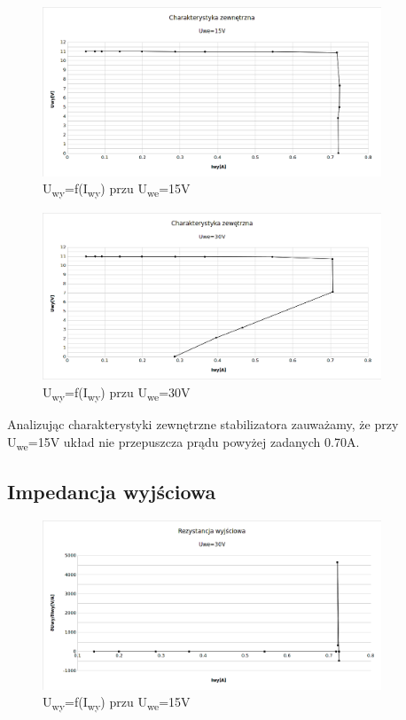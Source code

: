 \documentclass[a4paper,12pt]{article}
\begin{document}
\begin{figure}[h]
  \center
  \includegraphics[width=0.9\textwidth]{charak-zew1}
  \caption{U\textsubscript{wy}=f(I\textsubscript{wy}) przu U\textsubscript{we}=15V}
\end{figure}

\begin{figure}[h]
  \center
  \includegraphics[width=0.9\textwidth]{charak-zew2}
  \caption{U\textsubscript{wy}=f(I\textsubscript{wy}) przu U\textsubscript{we}=30V}
\end{figure}

Analizując charakterystyki zewnętrzne stabilizatora zauważamy, że przy U\textsubscript{we}=15V układ nie przepuszcza prądu powyżej zadanych 0.70A.


\pagebreak
\subsection{Impedancja wyjściowa}

\begin{figure}[h]
  \center
  \includegraphics[width=0.9\textwidth]{rezystancja1}
  \caption{U\textsubscript{wy}=f(I\textsubscript{wy}) przu U\textsubscript{we}=15V}
\end{figure}
\end{document}
